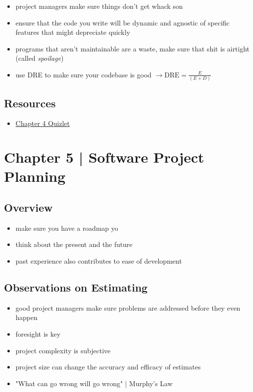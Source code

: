 \documentclass{article}
\begin{document}
\begin{itemize}
\item project managers make sure things don't get whack son
\item ensure that the code you write will be dynamic and agnostic of specific features that might depreciate quickly
\item programs that aren't maintainable are a waste, make sure that shit is airtight (called \emph{spoilage})
\item use DRE to make sure your codebase is good $\rightarrow \textrm{DRE} = \frac{E}{(E + D)}$
\end{itemize}

\subsection{Resources}
\begin{itemize}
\item \href{https://quizlet.com/278053354/software-engineering-a-practitioners-approach-pressman-ch-4-flash-cards/}{Chapter 4 Quizlet}
\end{itemize}


\newpage

\section{Chapter 5 | Software Project Planning}

\subsection{Overview}

\begin{itemize}
\item make sure you have a roadmap yo
\item think about the present and the future
\item past experience also contributes to ease of development
\end{itemize}

\subsection{Observations on Estimating}

\begin{itemize}
\item good project managers make sure problems are addressed before they even happen
\item foresight is key
\item project complexity is subjective 
\item project size can change the accuracy and efficacy of estimates
\item "What can go wrong will go wrong" | Murphy's Law
\end{itemize}
\end{document}
